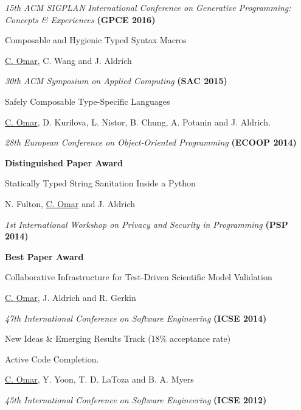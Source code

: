 \documentclass[10pt,letterpaper]{article}
\renewenvironment{itemize}{
  \begin{list}{}{
    \setlength{\leftmargin}{1.25em}
    \setlength{\itemsep}{0.25em}
    \setlength{\parskip}{0pt}
    \setlength{\parsep}{0.2em}
  }
}{
  \end{list}
}
\begin{document}
\begin{enumerate}
\begin{itemize}
    \item \textit{15th ACM SIGPLAN International Conference on Generative Programming: Concepts \& Experiences} {\textbf{(GPCE 2016)}}
  \end{itemize}
\item Composable and Hygienic Typed Syntax Macros
  \begin{itemize}
    \item \underline{C. Omar}, C. Wang and J. Aldrich
    \item \textit{30th ACM Symposium on Applied Computing} {\textbf{(SAC 2015)}}
  \end{itemize}
\item {Safely Composable Type-Specific Languages}
  \begin{itemize}
    \item \underline{C. Omar}, D. Kurilova, L. Nistor, B. Chung, A. Potanin and J. Aldrich.
    \item \textit{28th European Conference on Object-Oriented Programming} {\textbf{(ECOOP 2014)}}
    \item \textbf{Distinguished Paper Award}
  \end{itemize}
\item Statically Typed String Sanitation Inside a Python
  \begin{itemize}
    \item N. Fulton, \underline{C. Omar} and J. Aldrich
    \item \textit{1st International Workshop on Privacy and Security in Programming} {\textbf{(PSP 2014)}}
    \item \textbf{Best Paper Award}
  \end{itemize}  
\item Collaborative Infrastructure for Test-Driven Scientific Model Validation
  \begin{itemize}
    \item \underline{C. Omar}, J. Aldrich and R. Gerkin
    \item \textit{47th International Conference on Software Engineering} {\textbf{(ICSE 2014)}}
    \item New Ideas \& Emerging Results Track (18\% acceptance rate)
  \end{itemize}
\item {Active Code Completion}.
  \begin{itemize}
      \item \underline{C. Omar}, Y. Yoon, T. D. LaToza and B. A. Myers
      \item \textit{45th International Conference on Software Engineering} {\textbf{(ICSE 2012)}}

\end{itemize}
\end{enumerate}
\end{document}
